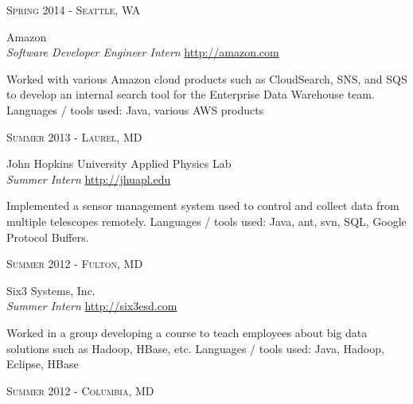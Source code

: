 \documentclass[10pt]{article} %
\begin{document}
{\begin{minipage}[t]{0.5\textwidth}
{\raggedleft\textsc{Spring 2014 - Seattle, WA}\par}

{\raggedright\large Amazon \\
\textit{Software Developer Engineer Intern}  \hfill {\small \href{http://amazon.com}{http://amazon.com}}\\ [5pt]}

\normalsize{Worked with various Amazon cloud products such as CloudSearch, SNS, 
and SQS to develop an internal search tool for the Enterprise Data Warehouse 
team. Languages / tools used: Java, various AWS products}\\


{\raggedleft\textsc{Summer 2013 - Laurel, MD}\par}

{\raggedright\large John Hopkins University Applied Physics Lab \\
\textit{Summer Intern}  \hfill {\small \href{http://jhuapl.edu}{http://jhuapl.edu}}\\ [5pt]}

\normalsize{Implemented a sensor management system used to control and collect data from multiple telescopes remotely. Languages / tools used: Java, ant, svn, SQL, Google Protocol Buffers.}\\


{\raggedleft\textsc{Summer 2012 - Fulton, MD}\par}

{\raggedright\large Six3 Systems, Inc. \\
\textit{Summer Intern} \hfill {\small \href{http://six3esd.com}{http://six3esd.com}} \\[5pt]}

\normalsize{Worked in a group developing a course to teach employees about big data solutions such as Hadoop, HBase, etc. Languages / tools used: Java, Hadoop, Eclipse, HBase}\\


{\raggedleft\textsc{Summer 2012 - Columbia, MD}\par}


\end{minipage}}
\end{document}
